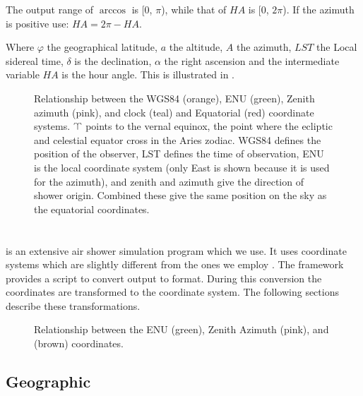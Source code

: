 The output range of $\arccos$ is [0, $\pi$), while that of $\mathit{HA}$ is
[0, $2\pi$). If the azimuth is positive use: $\mathit{HA} = 2 \pi -
\mathit{HA}$.

Where $\varphi$ the geographical latitude, $a$ the altitude, $A$ the
azimuth, $\mathit{LST}$ the Local sidereal time, $\delta$ is the
declination, $\alpha$ the right ascension and the intermediate variable
$\mathit{HA}$ is the hour angle. This is illustrated in
.


\begin{figure}
    \centering
    
    \caption{Relationship between the WGS84 (orange), ENU (green),
             Zenith azimuth (pink), and clock (teal) and Equatorial
             (red) coordinate systems. $\vernal$ points to the vernal
             equinox, the point where the ecliptic and celestial equator
             cross in the Aries zodiac. WGS84 defines the position of
             the observer, LST defines the time of observation, ENU is
             the local coordinate system (only East is shown because it
             is used for the azimuth), and zenith and azimuth give the
             direction of shower origin. Combined these give the same
             position on the sky as the equatorial coordinates.}
    \label{fig:wgs84_zenazi_lst_equatorial}
\end{figure}


\section{\corsika}
\label{sec:corsika}

\corsika is an extensive air shower simulation program which we use. It
uses coordinate systems which are slightly different from the ones we
employ \cite{heck:2013aa}. The \sapphire framework provides a script to
convert \corsika output to \hdf format. During this conversion the
coordinates are transformed to the \hisparc coordinate system. The
following sections describe these transformations.

\begin{figure}
    \centering
    
    \caption{Relationship between the ENU (green), Zenith Azimuth (pink),
             and \corsika (brown) coordinates.}
    \label{fig:enu_corsika}
\end{figure}


\subsection{Geographic}

